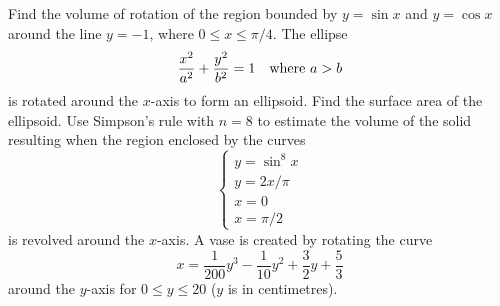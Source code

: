 \begin{questions}
  \questioE Find the volume of rotation of the region bounded by $ y = \sin x $ and $ y = \cos x $ around the line $ y = -1 $,
            where $ 0 \leq x \leq \pi/4 $.
  \questioM The ellipse
            \begin{displaymath}
              \frac{x^2}{a^2} + \frac{y^2}{b^2} = 1 \quad\text{where $ a > b $}
            \end{displaymath}
            is rotated around the $ x$-axis to form an ellipsoid. Find the surface area of the ellipsoid.
  \questioM Use Simpson's rule with $ n = 8 $ to estimate the volume of the solid resulting when the region enclosed by the curves
            \begin{displaymath}
            \begin{cases}
             y = \sin^8 x\\
             y = 2x/\pi\\
             x = 0\\
             x = \pi/2
            \end{cases}
            \end{displaymath}
            is revolved around the $ x$-axis.
  \questioS A vase is created by rotating the curve
            \begin{displaymath}
              x = \frac{1}{200} y^3 - \frac{1}{10} y^2 + \frac{3}{2} y + \frac{5}{3}
            \end{displaymath}
            around the $ y$-axis for $ 0 \leq y \leq 20 $ ($ y $ is in centimetres).
    \begin{parts}

\end{parts}
\end{questions}
